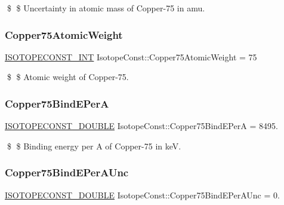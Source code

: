 \$ \$ Uncertainty in atomic mass of Copper-\/75 in amu. \mbox{\label{group___isotope_const-_copper-_cu75_gaeab09f705c786c7ae6fb07518438ee46}} 
\subsubsection{\texorpdfstring{Copper75\+Atomic\+Weight}{Copper75AtomicWeight}}
{\footnotesize\ttfamily \mbox{\hyperlink{group___isotope_const-_macros_ga5f18360b3e99483a35c32d789e62621c}{I\+S\+O\+T\+O\+P\+E\+C\+O\+N\+S\+T\+\_\+\+I\+NT}} Isotope\+Const\+::\+Copper75\+Atomic\+Weight = 75}

\$ \$ Atomic weight of Copper-\/75. \mbox{\label{group___isotope_const-_copper-_cu75_gaf43e7e5d8b627af7865b7ceadab69fd1}} 
\subsubsection{\texorpdfstring{Copper75\+Bind\+E\+PerA}{Copper75BindEPerA}}
{\footnotesize\ttfamily \mbox{\hyperlink{group___isotope_const-_macros_ga8f45a7272ce02c0b4c65c44636ed719a}{I\+S\+O\+T\+O\+P\+E\+C\+O\+N\+S\+T\+\_\+\+D\+O\+U\+B\+LE}} Isotope\+Const\+::\+Copper75\+Bind\+E\+PerA = 8495.}

\$ \$ Binding energy per A of Copper-\/75 in keV. \mbox{\label{group___isotope_const-_copper-_cu75_ga7a42ec1d51b917874dedbc6690854c15}} 
\subsubsection{\texorpdfstring{Copper75\+Bind\+E\+Per\+A\+Unc}{Copper75BindEPerAUnc}}
{\footnotesize\ttfamily \mbox{\hyperlink{group___isotope_const-_macros_ga8f45a7272ce02c0b4c65c44636ed719a}{I\+S\+O\+T\+O\+P\+E\+C\+O\+N\+S\+T\+\_\+\+D\+O\+U\+B\+LE}} Isotope\+Const\+::\+Copper75\+Bind\+E\+Per\+A\+Unc = 0.}

